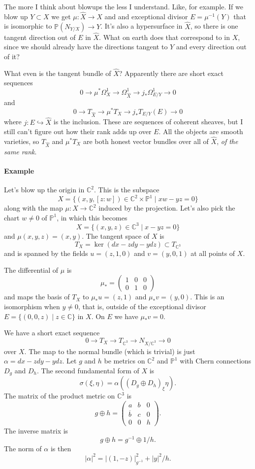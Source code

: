 \documentclass[11pt]{amsart}
\theoremstyle{definition}
\newcommand{\kk}[1]{\mathbb{#1}}
\def\ov#1{\overline{#1}}
\begin{document}
The more I think about blowups the less I understand.
Like, for example. If we blow up $Y \subset X$ we get $\mu : \widehat X \to X$
and and exceptional divisor $E = \mu^{-1}(Y)$ that is isomorphic to $\kk
P(N_{Y/X}) \to Y$.
It's also a hypersurface in $\widehat X$, so there is one tangent direction out
of $E$ in $\widehat X$.
What on earth does that correspond to in $X$, since we should already have the
directions tangent to $Y$ and every direction out of it?

What even is the tangent bundle of $\widehat X$?
Apparently there are short exact sequences
$$
0 \to \mu^*\Omega^1_X \to \Omega^1_{\widehat X} \to j_* \Omega^1_{E/Y} \to 0
$$
and
$$
0 \to T_{\widehat X} \to \mu^* T_X \to j_*T_{E/Y}(E) \to 0
$$
where $j : E \hookrightarrow \widehat X$ is the inclusion.
These are sequences of coherent sheaves, but I still can't figure out how their
rank adds up over $E$.
All the objects are smooth varieties, so $T_{\widehat X}$ and $\mu^* T_X$ are
both honest vector bundles over all of $\widehat X$, \emph{of the same rank}.


\paragraph{Example}

Let's blow up the origin in $\kk C^2$.
This is the subspace
$$
X = \{(x,y,[z:w]) \in \kk C^2 \times \kk P^1 \mid xw - yz = 0 \}
$$
along with the map $\mu : X \to \kk C^2$ induced by the projection.
Let's also pick the chart $w \not= 0$ of $\kk P^1$, in which this becomes
$$
X = \{(x,y,z) \in \kk C^3 \mid x - yz = 0 \}
$$
and $\mu(x,y,z) = (x,y)$.
The tangent space of $X$ is
$$
T_X = \ker (dx - z dy - y dz) \subset T_{\kk C^3}
$$
and is spanned by the fields $u = (z,1,0)$ and $v = (y,0,1)$ at all points of $X$.

The differential of $\mu$ is
$$
\mu_* = \begin{pmatrix}
1 & 0 & 0
\\
0 & 1 & 0
\end{pmatrix}
$$
and maps the basis of $T_X$ to $\mu_* u = (z,1)$ and $\mu_* v = (y,0)$.
This is an isomorphism when $y \not= 0$, that is, outside of the exceptional
divisor $E = \{(0,0,z) \mid z \in \kk C \}$ in $X$.
On $E$ we have $\mu_* v = 0$.

We have a short exact sequence
$$
0 \to T_X \to T_{\kk C^3} \to N_{X/\kk C^3} \to 0
$$
over $X$.
The map to the normal bundle (which is trivial) is just $\alpha = dx - zdy - ydz$.
Let $g$ and $h$ be metrics on $\kk C^2$ and $\kk P^1$ with Chern connections
$D_g$ and $D_h$.
The second fundamental form of $X$ is
$$
\sigma(\xi, \eta)
= \alpha((D_g \oplus D_h)_\xi \eta).
$$
The matrix of the product metric on $\kk C^3$ is
$$
g \oplus h
= \begin{pmatrix}
a & b & 0
\\
\ov b & c & 0
\\
0 & 0 & h
\end{pmatrix}.
$$
The inverse matrix is
$$
g \oplus h
= g^{-1} \oplus 1/h.
$$
The norm of $\alpha$ is then
$$
|\alpha|^2
= |(1,-z)|^2_{g^{-1}} + |y|^2/h.
$$
\end{document}
